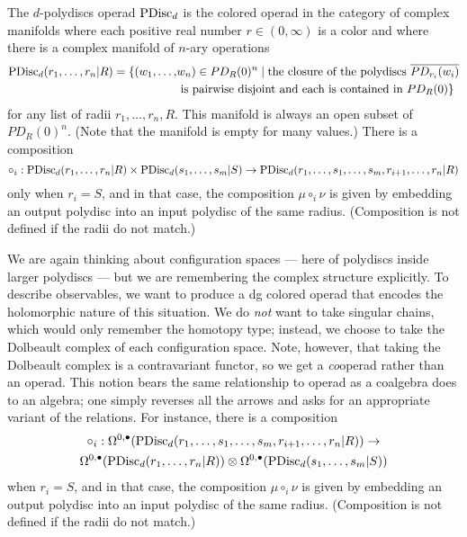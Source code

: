 \documentclass[11pt]{amsart}
\begin{document}
\begin{dfn}
The {$d$-polydiscs operad} ${\rm PDisc}_d$ is the colored operad in the category of complex manifolds where each positive real number $r \in (0,\infty)$ is a color 
and where there is a complex manifold of $n$-ary operations
\begin{align*}
{\rm PDisc}_d(r_1, \ldots, r_n| R) = \{ (w_1, \ldots,& w_n) \in PD_R(0)^n \;|\; 
\text{the closure of the polydiscs $\overline{PD_{r_i}(w_i)}$}\\ 
&\text{ is pairwise disjoint and each is contained in $PD_R(0)$}\}
\end{align*}
for any list of radii $r_1,\ldots, r_n, R$.
This manifold is always an open subset of~$PD_R(0)^n$. 
(Note that the manifold is empty for many values.)
There is a composition
\[
\circ_i: {\rm PDisc}_d(r_1, \ldots, r_n| R) \times {\rm PDisc}_d(s_1, \ldots, s_m| S) \to {\rm PDisc}_d(r_1, \ldots, s_1, \ldots, s_m, r_{i+1}, \ldots, r_n| R)
\]
only when $r_i = S$, 
and in that case, the composition $\mu \circ_i \nu$ is given by embedding an output polydisc into an input polydisc of the same radius.
(Composition is not defined if the radii do not match.)
\end{dfn}

We are again thinking about configuration spaces --- here of polydiscs inside larger polydiscs --- but we are remembering the complex structure explicitly.
To describe observables, we want to produce a dg colored operad that encodes the holomorphic nature of this situation.
We do {\em not} want to take singular chains, which would only remember the homotopy type;
instead, we choose to take the Dolbeault complex of each configuration space.
Note, however, that taking the Dolbeault complex is a contravariant functor,
so we get a {\em co}\/operad rather than an operad.
This notion bears the same relationship to operad as a coalgebra does to an algebra;
one simply reverses all the arrows and asks for an appropriate variant of the relations.
For instance, there is a composition
\begin{multline}
\label{pdcirc}
\circ_i: \Omega^{0,\bullet}({\rm PDisc}_d(r_1, \ldots, s_1, \ldots, s_m, r_{i+1}, \ldots, r_n| R)) \to \\
\Omega^{0,\bullet}({\rm PDisc}_d(r_1, \ldots, r_n| R)) \otimes \Omega^{0,\bullet}({\rm PDisc}_d(s_1, \ldots, s_m| S))
\end{multline}
when $r_i = S$, and in that case, the composition $\mu \circ_i \nu$ is given by embedding an output polydisc into an input polydisc of the same radius.
(Composition is not defined if the radii do not match.)
\end{document}
